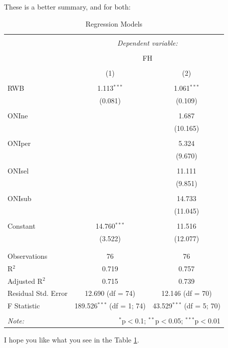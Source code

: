 \documentclass[11pt]{article}
\begin{document}
\clearpage
These is a better summary, and for both:

\begin{table}[!htbp] \centering 
  \caption{Regression Models} 
  \label{regs} 
\begin{tabular}{@{\extracolsep{5pt}}lcc} 
\\[-1.8ex]\hline 
\hline \\[-1.8ex] 
 & \multicolumn{2}{c}{\textit{Dependent variable:}} \\ 
\cline{2-3} 
\\[-1.8ex] & \multicolumn{2}{c}{FH} \\ 
\\[-1.8ex] & (1) & (2)\\ 
\hline \\[-1.8ex] 
 RWB & 1.113$^{***}$ & 1.061$^{***}$ \\ 
  & (0.081) & (0.109) \\ 
  & & \\ 
 ONIne &  & 1.687 \\ 
  &  & (10.165) \\ 
  & & \\ 
 ONIper &  & 5.324 \\ 
  &  & (9.670) \\ 
  & & \\ 
 ONIsel &  & 11.111 \\ 
  &  & (9.851) \\ 
  & & \\ 
 ONIsub &  & 14.733 \\ 
  &  & (11.045) \\ 
  & & \\ 
 Constant & 14.760$^{***}$ & 11.516 \\ 
  & (3.522) & (12.077) \\ 
  & & \\ 
\hline \\[-1.8ex] 
Observations & 76 & 76 \\ 
R$^{2}$ & 0.719 & 0.757 \\ 
Adjusted R$^{2}$ & 0.715 & 0.739 \\ 
Residual Std. Error & 12.690 (df = 74) & 12.146 (df = 70) \\ 
F Statistic & 189.526$^{***}$ (df = 1; 74) & 43.529$^{***}$ (df = 5; 70) \\ 
\hline 
\hline \\[-1.8ex] 
\textit{Note:}  & \multicolumn{2}{r}{$^{*}$p$<$0.1; $^{**}$p$<$0.05; $^{***}$p$<$0.01} \\ 
\end{tabular} 
\end{table} 
I hope you like what you see in the Table \ref{regs}.
\end{document}
